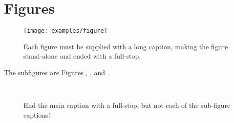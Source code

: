%
%
\chapter{Figures}



\begin{figure}[h!tb]
\centering

\texttt{[image: examples/figure]} %
 
\caption[Do not end short caption with full-stop]{Each figure must be supplied with a long caption, making the figure stand-alone and ended with a full-stop.}

\end{figure}





\newpage





%

The subfigures are Figures , ,  and .

\begin{figure}
\centering

\quad
{}
\\
\quad
{}
\caption[Do not end short caption with full-stop]{End the main caption with a full-stop, but not each of the sub-figure captions!}
\label{thislabel}
\end{figure}
